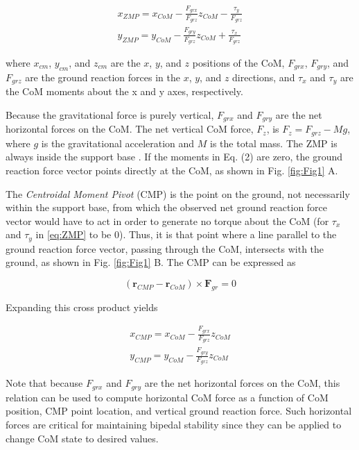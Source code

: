\documentclass{llncs}
\begin{document}
\begin{eqnarray}
x_{ZMP} = x_{CoM} - \frac{F_{grx}}{F_{grz}} z_{CoM} - \frac{\tau_y}{F_{grz}}\\
y_{ZMP} = y_{CoM} - \frac{F_{gry}}{F_{grz}} z_{CoM} + \frac{\tau_x}{F_{grz}}
\label{eq:ZMP}
\end{eqnarray}

\noindent where $x_{cm}$, $y_{cm}$, and $z_{cm}$ are the $x$, $y$, and $z$ positions of the CoM, $F_{grx}$, $F_{gry}$, and $F_{grz}$ are the ground 
reaction forces in the $x$, $y$, and $z$ directions, and $\tau_x$ and $\tau_y$ are the CoM moments about the x and y axes, respectively.

Because the gravitational force is purely vertical, $F_{grx}$ and $F_{gry}$ are the net horizontal forces on the CoM.  The net vertical CoM force, $F_z$,
is $F_z = F_{grz} - Mg$, where $g$ is the gravitational acceleration and $M$ is the total mass.
The ZMP is always inside the support base \cite{popovic2005ground}.  If the moments in Eq. (2) are zero, the ground reaction force vector points directly at the CoM, as shown in Fig. \ref{fig:Fig1} A.

The \textit{Centroidal Moment Pivot} (CMP) is the point on the ground, not necessarily within the support base, from  which the observed net ground reaction 
force vector would have to act in order to generate no torque about the CoM (for $\tau_x$ and $\tau_y$ in \ref{eq:ZMP} to be 0).
Thus, it is that point where a line parallel to the ground reaction force vector, passing through the CoM, intersects with the ground, 
as shown in Fig. \ref{fig:Fig1} B.  
The CMP can be expressed as

\begin{equation}
\left( \mathbf{r}_{CMP} - \mathbf{r}_{CoM} \right) \times \mathbf{F}_{gr} = 0
\label{eq:CMP}
\end{equation}

Expanding this cross product yields

\begin{eqnarray}
x_{CMP} = x_{CoM} - \frac{F_{grx}}{F_{grz}} z_{CoM}\\
y_{CMP} = y_{CoM} - \frac{F_{gry}}{F_{grz}} z_{CoM}
\label{eq:CMP2}
\end{eqnarray}

\noindent Note that because $F_{grx}$ and $F_{gry}$ are the net horizontal forces on the CoM, this relation can be used to compute horizontal CoM force 
as a function of CoM position, CMP point location, and vertical ground reaction force.  
Such horizontal forces are critical for maintaining bipedal stability since they can be applied to change CoM state to desired values.  
\end{document}
